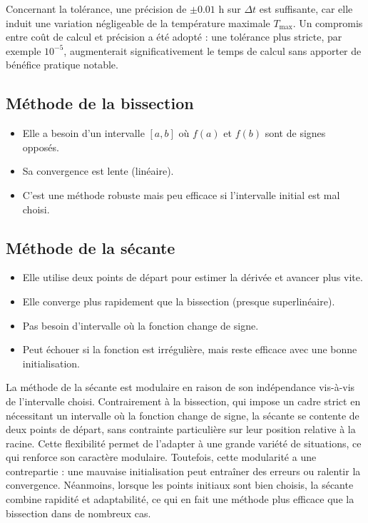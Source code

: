 \documentclass[12pt]{article}
\begin{document}
Concernant la tolérance, une précision de $\pm 0.01$ h sur $\Delta t$ est suffisante, car elle induit une variation négligeable de la température maximale $T_{\max}$. Un compromis entre coût de calcul et précision a été adopté : une tolérance plus stricte, par exemple $10^{-5}$, augmenterait significativement le temps de calcul sans apporter de bénéfice pratique notable.
\subsection*{Méthode de la bissection}

\begin{itemize}
    \item Elle a besoin d'un intervalle $[a,b]$ où $f(a)$ et $f(b)$ sont de signes opposés.
    \item Sa convergence est lente (linéaire).
    \item C'est une méthode robuste mais peu efficace si l'intervalle initial est mal choisi.
\end{itemize}

\vspace{0.5cm}
\subsection*{Méthode de la sécante}

\begin{itemize}
    \item Elle utilise deux points de départ pour estimer la dérivée et avancer plus vite.
    \item Elle converge plus rapidement que la bissection (presque superlinéaire).
    \item Pas besoin d'intervalle où la fonction change de signe.
    \item Peut échouer si la fonction est irrégulière, mais reste efficace avec une bonne initialisation.
\end{itemize}


\vspace{0.5cm}
 La méthode de la sécante est modulaire en raison de son indépendance vis-à-vis de l’intervalle choisi. Contrairement à la bissection, qui impose un cadre strict en nécessitant un intervalle où la fonction change de signe, la sécante se contente de deux points de départ, sans contrainte particulière sur leur position relative à la racine. Cette flexibilité permet de l’adapter à une grande variété de situations, ce qui renforce son caractère modulaire. Toutefois, cette modularité a une contrepartie : une mauvaise initialisation peut entraîner des erreurs ou ralentir la convergence. Néanmoins, lorsque les points initiaux sont bien choisis, la sécante combine rapidité et adaptabilité, ce qui en fait une méthode plus efficace que la bissection dans de nombreux cas.
\end{document}
